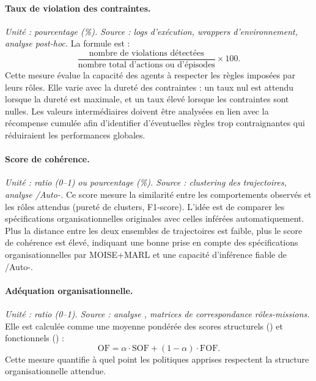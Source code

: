 \paragraph{Taux de violation des contraintes.}
\textit{Unité : pourcentage (\%). Source : logs d’exécution, wrappers d’environnement, analyse post-hoc.}
La formule est :
\[
  \frac{\text{nombre de violations détectées}}{\text{nombre total d’actions ou d’épisodes}} \times 100.
\]
Cette mesure évalue la capacité des agents à respecter les règles imposées par leurs rôles.
Elle varie avec la dureté des contraintes : un taux nul est attendu lorsque la dureté est maximale, et un taux élevé lorsque les contraintes sont nulles.
Les valeurs intermédiaires doivent être analysées en lien avec la récompense cumulée afin d’identifier d’éventuelles règles trop contraignantes qui réduiraient les performances globales.

\paragraph{Score de cohérence.}
\textit{Unité : ratio (0–1) ou pourcentage (\%). Source : clustering des trajectoires, analyse /Auto-.}
Ce score mesure la similarité entre les comportements observés et les rôles attendus (pureté de clusters, F1-score).
L’idée est de comparer les spécifications organisationnelles originales avec celles inférées automatiquement.
Plus la distance entre les deux ensembles de trajectoires est faible, plus le score de cohérence est élevé, indiquant une bonne prise en compte des spécifications organisationnelles par MOISE+MARL et une capacité d’inférence fiable de /Auto-.

\paragraph{Adéquation organisationnelle.}
\textit{Unité : ratio (0–1). Source : analyse , matrices de correspondance rôles-missions.}
Elle est calculée comme une moyenne pondérée des scores structurels () et fonctionnels () :
\[
  \text{OF} = \alpha \cdot \text{SOF} + (1-\alpha) \cdot \text{FOF}.
\]
Cette mesure quantifie à quel point les politiques apprises respectent la structure organisationnelle attendue.

